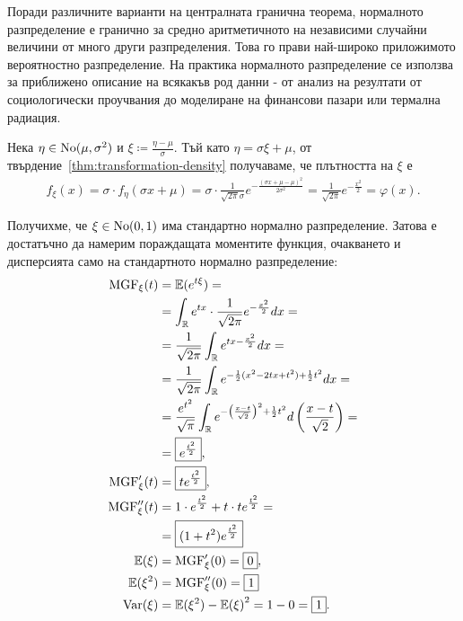 \documentclass[numbers=endperiod, bibliography=totocnumbered]{scrartcl}
\begin{document}
Поради различните варианти на централната гранична теорема, нормалното разпределение е гранично за средно аритметичното на независими случайни величини от много други разпределения. Това го прави най-широко приложимото вероятностно разпределение. На практика нормалното разпределение се използва за приближено описание на всякакъв род данни - от анализ на резултати от социологически проучвания до моделиране на финансови пазари или термална радиация.

Нека \( \eta \in \operatorname{No}(\mu, \sigma^2) \) и \( \xi \coloneqq \frac {\eta - \mu} \sigma \). Тъй като \( \eta = \sigma \xi + \mu \), от твърдение~\ref{thm:transformation-density} получаваме, че плътността на \( \xi \) е
\begin{align*}
  f_\xi(x)
  =
  \sigma \cdot f_\eta(\sigma x + \mu)
  =
  \sigma \cdot \frac 1 {\sqrt{2\pi} \sigma} e^{-\frac{{(\sigma x + \mu -\mu)}^2} {2\sigma^2}}
  =
  \frac 1 {\sqrt{2\pi}} e^{-\frac {x^2} 2}
  =
  \varphi(x).
\end{align*}

Получихме, че \( \xi \in \operatorname{No}(0, 1) \) има стандартно нормално разпределение. Затова е достатъчно да намерим пораждащата моментите функция, очакването и дисперсията само на стандартното нормално разпределение:
\begingroup
\allowdisplaybreaks
\begin{align*}
  \operatorname{MGF}_\xi(t)
  &=
  \mathbb{E}(e^{t\xi})
  = \\ &=
  \int_{\mathbb{R}} e^{tx} \cdot \frac 1 {\sqrt{2\pi}} e^{-\frac {x^2} 2} dx
  = \\ &=
  \frac 1 {\sqrt{2\pi}} \int_{\mathbb{R}} e^{tx -\frac {x^2} 2} dx
  = \\ &=
  \frac 1 {\sqrt{2\pi}} \int_{\mathbb{R}} e^{- \frac 1 2 (x^2 - 2tx + t^2) + \frac 1 2 t^2} dx
  = \\ &=
  \frac {e^{t^2}} {\sqrt \pi} \int_{\mathbb{R}} e^{- {\left(\frac {x - t} {\sqrt 2} \right)}^2 + \frac 1 2 t^2} d\left( \frac {x - t} {\sqrt 2} \right)
  = \\ &=
  \boxed{e^{\frac {t^2} 2}},
  \\
  \operatorname{MGF}'_\xi(t)
  &=
  \boxed{t e^{\frac {t^2} 2}},
  \\
  \operatorname{MGF}''_\xi(t)
  &=
  1 \cdot e^{\frac {t^2} 2} + t \cdot t e^{\frac {t^2} 2}
  = \\ &=
  \boxed{(1 + t^2) e^{\frac {t^2} 2}}
  \\
  \mathbb{E}(\xi)
  &=
  \operatorname{MGF}'_\xi(0)
  =
  \boxed{0},
  \\
  \mathbb{E}(\xi^2)
  &=
  \operatorname{MGF}''_\xi(0)
  =
  \boxed{1}
  \\
  \operatorname{Var}(\xi)
  &=
  \mathbb{E}(\xi^2) - {\mathbb{E}(\xi)}^2
  =
  1 - 0
  =
  \boxed{1}.
\end{align*}
\endgroup
\end{document}
